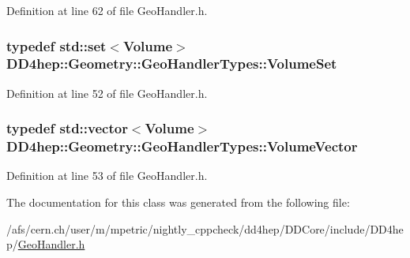 Definition at line 62 of file GeoHandler.h.\hypertarget{class_d_d4hep_1_1_geometry_1_1_geo_handler_types_a87ea3b22bdfe08f1a4afca3d58fd8ca0}{
\subsubsection[{VolumeSet}]{\setlength{\rightskip}{0pt plus 5cm}typedef std::set$<${\bf Volume}$>$ {\bf DD4hep::Geometry::GeoHandlerTypes::VolumeSet}}}
\label{class_d_d4hep_1_1_geometry_1_1_geo_handler_types_a87ea3b22bdfe08f1a4afca3d58fd8ca0}


Definition at line 52 of file GeoHandler.h.\hypertarget{class_d_d4hep_1_1_geometry_1_1_geo_handler_types_a6713619ef278692ebdf9f6ee4a3f32de}{
\subsubsection[{VolumeVector}]{\setlength{\rightskip}{0pt plus 5cm}typedef std::vector$<${\bf Volume}$>$ {\bf DD4hep::Geometry::GeoHandlerTypes::VolumeVector}}}
\label{class_d_d4hep_1_1_geometry_1_1_geo_handler_types_a6713619ef278692ebdf9f6ee4a3f32de}


Definition at line 53 of file GeoHandler.h.

The documentation for this class was generated from the following file:\begin{DoxyCompactItemize}
\item 
/afs/cern.ch/user/m/mpetric/nightly\_\-cppcheck/dd4hep/DDCore/include/DD4hep/\hyperlink{_geo_handler_8h}{GeoHandler.h}\end{DoxyCompactItemize}
